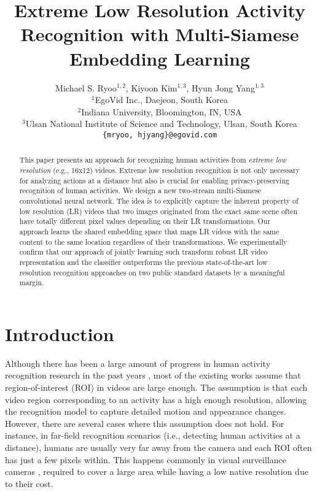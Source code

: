 \documentclass[letterpaper]{article} %
\begin{document}
\title{Extreme Low Resolution Activity Recognition with Multi-Siamese \\Embedding Learning}

\author{Michael S. Ryoo$^{1,2}$, Kiyoon Kim$^{1,3}$, Hyun Jong Yang$^{1,3}$\\
$^1$EgoVid Inc., Daejeon, South Korea\\
$^2$Indiana University, Bloomington, IN, USA\\
$^3$Ulsan National Institute of Science and Technology, Ulsan, South Korea\\
\texttt{\{mryoo, hjyang\}@egovid.com}\\
}

\maketitle

\begin{abstract}
This paper presents an approach for recognizing human activities from \emph{extreme low resolution} (e.g., 16x12) videos. Extreme low resolution recognition is not only necessary for analyzing actions at a distance but also is crucial for enabling privacy-preserving recognition of human activities. We design a new two-stream multi-Siamese convolutional neural network. The idea is to explicitly capture the inherent property of low resolution (LR) videos that two images originated from the exact same scene often have totally different pixel values depending on their LR transformations. Our approach learns the shared embedding space that maps LR videos with the same content to the same location regardless of their transformations. We experimentally confirm that our approach of jointly learning such transform robust LR video representation and the classifier outperforms the previous state-of-the-art low resolution recognition approaches on two public standard datasets by a meaningful margin.
\end{abstract}









\section{Introduction}

Although there has been a large amount of progress in human activity recognition research in the past years \cite{ryoo-review,simonyan14,google15,c3d}, most of the existing works assume that region-of-interest (ROI) in videos are large enough. The assumption is that each video region corresponding to an activity has a high enough resolution, allowing the recognition model to capture detailed motion and appearance changes. However, there are several cases where this assumption does not hold. For instance, in far-field recognition scenarios (i.e., detecting human activities at a distance), humans are usually very far away from the camera and each ROI often has just a few pixels within. This happens commonly in visual surveillance cameras \cite{efros2003recognizing,reddy2012human}, required to cover a large area while having a low native resolution due to their cost.
\end{document}
